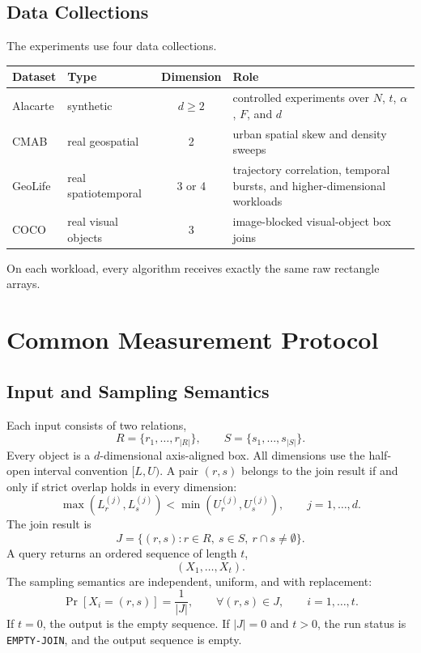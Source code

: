 \documentclass[11pt]{article}
\newcommand{\status}[1]{\texttt{#1}}
\begin{document}
\subsection{Data Collections}
The experiments use four data collections.

\begin{center}
\begin{tabularx}{\linewidth}{@{}l l c Y@{}}
\toprule
Dataset & Type & Dimension & Role \\
\midrule
Alacarte & synthetic & $d\ge 2$ & controlled experiments over $N$, $t$, $\alpha$, $F$, and $d$ \\
CMAB & real geospatial & 2 & urban spatial skew and density sweeps \\
GeoLife & real spatiotemporal & 3 or 4 & trajectory correlation, temporal bursts, and higher-dimensional workloads \\
COCO & real visual objects & 3 & image-blocked visual-object box joins \\
\bottomrule
\end{tabularx}
\end{center}

On each workload, every algorithm receives exactly the same raw rectangle arrays.

\section{Common Measurement Protocol}

\subsection{Input and Sampling Semantics}
Each input consists of two relations,
\[
R=\{r_1,\ldots,r_{|R|}\},\qquad
S=\{s_1,\ldots,s_{|S|}\}.
\]
Every object is a $d$-dimensional axis-aligned box.  All dimensions use the half-open interval convention $[L,U)$.  A pair $(r,s)$ belongs to the join result if and only if strict overlap holds in every dimension:
\[
\max\left(L_r^{(j)},L_s^{(j)}\right)
<
\min\left(U_r^{(j)},U_s^{(j)}\right),
\qquad j=1,\ldots,d.
\]
The join result is
\[
J=\{(r,s):r\in R,\ s\in S,\ r\cap s\ne\emptyset\}.
\]
A query returns an ordered sequence of length $t$,
\[
(X_1,\ldots,X_t).
\]
The sampling semantics are independent, uniform, and with replacement:
\[
\Pr[X_i=(r,s)]=\frac{1}{|J|},
\qquad \forall (r,s)\in J,
\qquad i=1,\ldots,t.
\]
If $t=0$, the output is the empty sequence.  If $|J|=0$ and $t>0$, the run status is \status{EMPTY-JOIN}, and the output sequence is empty.
\end{document}
